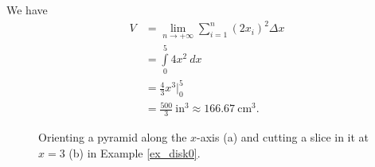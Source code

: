 \begin{example}
We have 
\allowdisplaybreaks
\begin{align*} V &= \lim_{n\to+\infty} \sum_{i=1}^n (2x_i)^2\Delta x\\[0.2cm]
							&= \int\limits_0^5 4x^2\ dx\\[0.2cm]
				&= \frac43x^3\Big|_0^5 \\[0.2cm]
				&=\frac{500}{3}\ \text{in}^3 \approx 166.67\ \text{cm}^3.
\end{align*}
\begin{figure}[H]
\centering
\qquad
{}
\caption{Orienting a pyramid along the $x$-axis (a) and cutting a slice in it at $x=3$ (b) in Example \ref{ex_disk0}.}
\end{figure}

\end{example}

